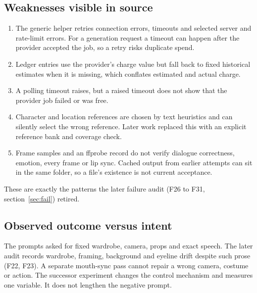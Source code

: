 \documentclass[11pt,a4paper]{article}
\newcommand{\code}[1]{\texttt{\detokenize{#1}}}
\begin{document}
\subsection{Weaknesses visible in source}
\begin{enumerate}
\item The generic \code{post} helper retries connection errors, timeouts and selected server and rate-limit errors. For a generation request a timeout can happen after the provider accepted the job, so a retry risks duplicate spend.
\item Ledger entries use the provider's charge value but fall back to fixed historical estimates when it is missing, which conflates estimated and actual charge.
\item A polling timeout raises, but a raised timeout does not show that the provider job failed or was free.
\item Character and location references are chosen by text heuristics and can silently select the wrong reference. Later work replaced this with an explicit reference bank and coverage check.
\item Frame samples and an ffprobe record do not verify dialogue correctness, emotion, every frame or lip sync. Cached output from earlier attempts can sit in the same folder, so a file's existence is not current acceptance.
\end{enumerate}
These are exactly the patterns the later failure audit (F26 to F31, section~\ref{sec:fail}) retired.

\subsection{Observed outcome versus intent}
The prompts asked for fixed wardrobe, camera, props and exact speech. The later audit records wardrobe, framing, background and eyeline drift despite such prose (F22, F23). A separate mouth-sync pass cannot repair a wrong camera, costume or action. The successor experiment changes the control mechanism and measures one variable. It does not lengthen the negative prompt.
\end{document}

